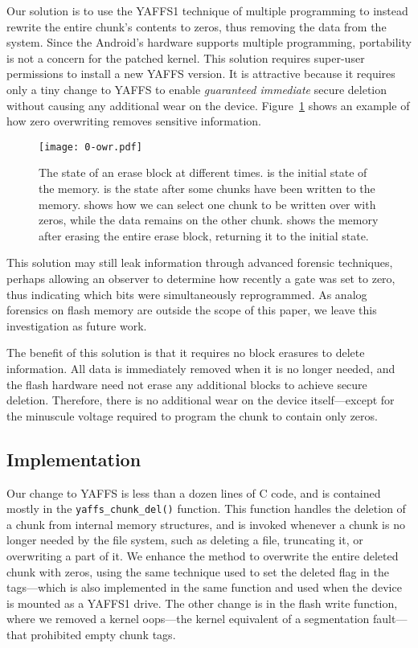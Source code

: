 \documentclass{acmtog}
\begin{document}
Our solution is to use the YAFFS1 technique of multiple programming to instead
rewrite the entire chunk's contents to zeros, thus removing the data from the
system. Since the Android's hardware supports multiple programming, portability
is not a concern for the patched kernel.
This solution requires super-user permissions to install a new YAFFS
version. It is attractive because it
requires only a tiny change to YAFFS to enable \emph{guaranteed immediate}
secure deletion without causing any additional wear on the device. 
Figure~\ref{f:0owr} shows an example of how zero overwriting removes
sensitive information.

\begin{figure}[t]
  \centering
  \texttt{[image: 0-owr.pdf]}
  \caption{\small The state of an erase block at different times.  is the
  initial state of the memory.  is the state after some chunks have been
  written to the memory.  shows how we can select one chunk to be written
  over with zeros, while the data remains on the other chunk.  shows the
  memory after erasing the entire erase block, returning it to the initial
  state.\label{f:0owr}\normalsize}
\end{figure}


This solution may still leak information through advanced forensic
techniques, perhaps allowing  an observer to determine how recently a gate was set
to zero, thus indicating which bits were simultaneously reprogrammed. As analog forensics on flash memory are outside the
scope of this paper, we leave this investigation as future work.

The benefit of this solution is that it requires no block erasures to delete
information. All data is immediately removed when it is no longer
needed, and the flash hardware need not erase any additional blocks
to achieve secure deletion. Therefore, there is no additional wear on the device
itself---except for the minuscule voltage required to program the
chunk to contain only zeros.

\subsection{Implementation} 
Our change to YAFFS is less than a dozen lines of C code, and is 
contained mostly in the \texttt{yaffs\_chunk\_del()} function. This function handles
the deletion of a chunk from internal memory structures, and is invoked
whenever a chunk is  no longer needed by the file system, such as deleting
a file, truncating it, or overwriting a part of it. We enhance the
method to overwrite the entire deleted chunk with zeros, using the same technique used
to set the deleted flag in the tags---which is also implemented in the same
function and used when the device is mounted as a YAFFS1 drive. The other
change is in the flash write function, where we removed a kernel oops---the
kernel equivalent of a segmentation fault---that
prohibited empty chunk tags. 
\end{document}

